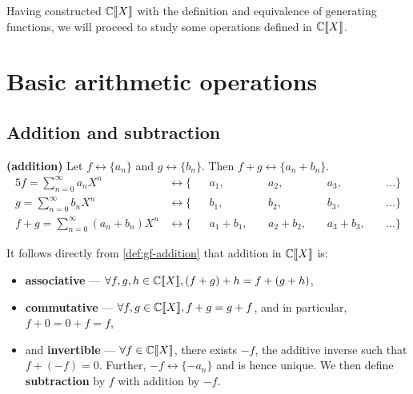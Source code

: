 \documentclass[a4paper, 12pt]{report}
\begin{document}
Having constructed $\mathbb{C}\llbracket X \rrbracket$ with the definition and equivalence of generating functions, we will proceed to study some operations defined in $\mathbb{C}\llbracket X \rrbracket$.

\section{Basic arithmetic operations}
\subsection{Addition and subtraction}
\begin{defn}\label{def:gf-addition}
\textbf{(addition)} Let $f \longleftrightarrow \{a_n\}$ and $g \longleftrightarrow \{b_n\}$. Then $f + g \longleftrightarrow \{a_n + b_n\}$.
\begin{alignat*}{5}
    f = \sum_{n = 0}^\infty a_n X^n &\longleftrightarrow \{&&a_1, &&a_2, &&a_3, &&\dots\}\\
    g = \sum_{n = 0}^\infty b_n X^n &\longleftrightarrow \{&&b_1, &&b_2, &&b_3, &&\dots\}\\
    f + g = \sum_{n = 0}^\infty (a_n + b_n) X^n &\longleftrightarrow \{&&a_1 + b_1,~&&a_2 + b_2,~&&a_3 + b_3,~&&\dots\}
\end{alignat*}
\end{defn}
\begin{rem}\label{rem:gf-addition-properties}
It follows directly from \cref{def:gf-addition} that addition in $\mathbb{C}\llbracket X \rrbracket$ is:
\begin{itemize}
    \item \textbf{associative} --- $\forall f, g, h \in \mathbb{C}\llbracket X \rrbracket, (f + g) + h = f + (g + h)$,
    \item \textbf{commutative} --- $\forall f, g \in \mathbb{C}\llbracket X \rrbracket, f + g = g + f$, and in particular, $f + 0 = 0 + f = f$,
    \item and \textbf{invertible} --- $\forall f \in \mathbb{C}\llbracket X \rrbracket$, there exists $-f$, the additive inverse such that $f + (-f) = 0$. Further, $-f \longleftrightarrow \{-a_n\}$ and is hence unique. We then define \textbf{subtraction} by $f$ with addition by $-f$.
\end{itemize}
\end{rem}
\end{document}
